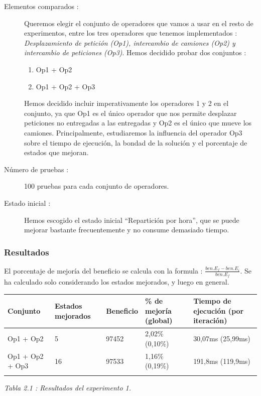 \documentclass{article}
\begin{document}
\begin{description}
\item[Elementos comparados :] Queremos elegir el conjunto de operadores que
vamos a usar en el resto de experimentos, entre los tres operadores que tenemos
implementados : \emph{Desplazamiento de petición (Op1), intercambio de camiones
(Op2) y intercambio de peticiones (Op3)}. Hemos decidido probar dos conjuntos :
\begin{enumerate}
\item Op1 + Op2
\item Op1 + Op2 + Op3
\end{enumerate}
Hemos decidido incluir imperativamente los operadores 1 y 2 en el conjunto, ya
que Op1 es el único operador que nos permite desplazar peticiones no entregadas
a las entregadas y Op2 es el único que mueve los camiones. Principalmente,
estudiaremos la influencia del operador Op3 sobre el tiempo de ejecución, la
bondad de la solución y el porcentaje de estados que mejoran.
\item[Número de pruebas :] 100 pruebas para cada conjunto de operadores.
\item[Estado inicial :] Hemos escogido el estado inicial ``Repartición por
hora'', que se puede mejorar bastante frecuentemente y no consume demasiado
tiempo.
\end{description}

\subsubsection{Resultados}

El porcentaje de mejoría del beneficio se calcula con la formula :
$\frac{ben. E_f - ben. E_i}{ben. E_f}$. Se ha calculado solo considerando los
estados mejorados, y luego en general.

\begin{center}
\begin{tabular}{|l|l|l|l|l|}
\hline
Conjunto & Estados mejorados & Beneficio &  \% de mejoría (global) & Tiempo de
ejecución (por iteración)\\
\hline
Op1 + Op2 & 5 & 97452 & 2,02\% (0,10\%) & 30,07ms (25,99ms)\\
\hline
Op1 + Op2 + Op3 & 16 & 97533 & 1,16\% (0,19\%) & 191,8ms (119,9ms)\\
\hline\\
\end{tabular}
{\it Tabla 2.1 : Resultados del experimento 1.}
\end{center}
\end{document}
